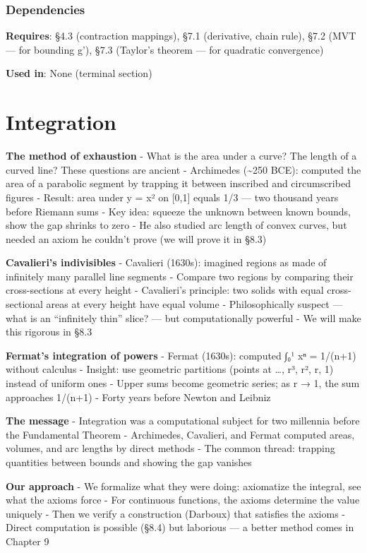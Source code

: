 \documentclass[
  10pt,
  letterpaper,
]{scrbook}
\begin{document}
\subsection{Dependencies}\label{dependencies-33}

\textbf{Requires}: §4.3 (contraction mappings), §7.1 (derivative, chain
rule), §7.2 (MVT --- for bounding g'), §7.3 (Taylor's theorem --- for
quadratic convergence)

\textbf{Used in}: None (terminal section)

\chapter{Integration}\label{integration}

\textbf{The method of exhaustion} - What is the area under a curve? The
length of a curved line? These questions are ancient - Archimedes
(\textasciitilde250 BCE): computed the area of a parabolic segment by
trapping it between inscribed and circumscribed figures - Result: area
under y = x² on {[}0,1{]} equals 1/3 --- two thousand years before
Riemann sums - Key idea: squeeze the unknown between known bounds, show
the gap shrinks to zero - He also studied arc length of convex curves,
but needed an axiom he couldn't prove (we will prove it in §8.3)

\textbf{Cavalieri's indivisibles} - Cavalieri (1630s): imagined regions
as made of infinitely many parallel line segments - Compare two regions
by comparing their cross-sections at every height - Cavalieri's
principle: two solids with equal cross-sectional areas at every height
have equal volume - Philosophically suspect --- what is an ``infinitely
thin'' slice? --- but computationally powerful - We will make this
rigorous in §8.3

\textbf{Fermat's integration of powers} - Fermat (1630s): computed ∫₀¹
xⁿ = 1/(n+1) without calculus - Insight: use geometric partitions
(points at \ldots, r³, r², r, 1) instead of uniform ones - Upper sums
become geometric series; as r → 1, the sum approaches 1/(n+1) - Forty
years before Newton and Leibniz

\textbf{The message} - Integration was a computational subject for two
millennia before the Fundamental Theorem - Archimedes, Cavalieri, and
Fermat computed areas, volumes, and arc lengths by direct methods - The
common thread: trapping quantities between bounds and showing the gap
vanishes

\textbf{Our approach} - We formalize what they were doing: axiomatize
the integral, see what the axioms force - For continuous functions, the
axioms determine the value uniquely - Then we verify a construction
(Darboux) that satisfies the axioms - Direct computation is possible
(§8.4) but laborious --- a better method comes in Chapter 9
\end{document}
